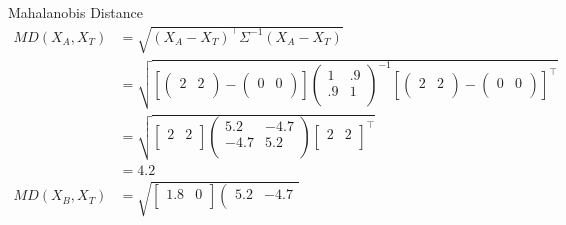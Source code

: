 \documentclass[xcolor=dvipsnames]{beamer}
\begin{document}
\begin{frame}{Mahalanobis Distance}
\begin{align*}
MD(X_A,X_{T}) &= \sqrt{
(X_A-X_T)^{\top} \Sigma^{-1}(X_A-X_T)}\\
 &=  \sqrt{
[\left(
       \begin{array}{cc}
         2 & 2 \\
       \end{array}
     \right)-\left(
                \begin{array}{cc}
                  0 &  0 \\
                \end{array}
              \right)] \left(
               \begin{array}{cc}
                  1 &  .9 \\
                   .9 & 1 \\
               \end{array}
             \right)^{-1} [\left(
       \begin{array}{cc}
         2 & 2 \\
       \end{array}
     \right)-\left(
                \begin{array}{cc}
                    0 &  0 \\
                \end{array}
              \right)]^{\top}}\\
& =  \sqrt{
\left[
       \begin{array}{cc}
         2 &  2 \\
       \end{array}
     \right] \left(
               \begin{array}{cc}
                   5.2 &  -4.7 \\
                   -4.7 & 5.2 \\
               \end{array}
             \right)\left[
       \begin{array}{cc}
         2 &  2 \\
       \end{array}
     \right]^{\top}}\\
 &= 4.2\\
MD(X_B,X_{T}) &=  \sqrt{
\left[
       \begin{array}{cc}
         1.8 &  0 \\
       \end{array}
     \right] \left(
               \begin{array}{cc}
                   5.2 &  -4.7 \\

\end{array}}
\end{align*}
\end{frame}
\end{document}
